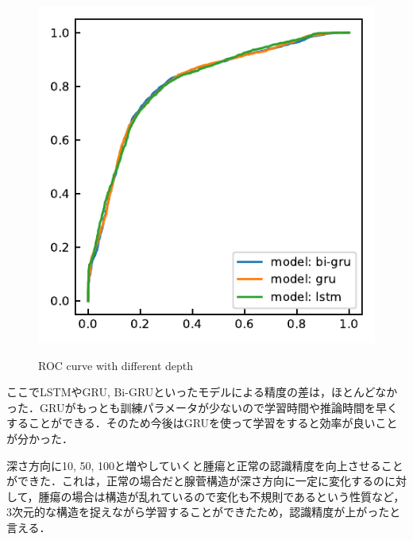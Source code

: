 \begin{figure}[H]
\begin{minipage}[b]{0.45\columnwidth}
		\label{fig:}
	\end{minipage}
	\begin{minipage}[b]{0.45\columnwidth}
		\centering
		\includegraphics[clip, width=\linewidth]{fig/chapter4/3d/roc/depth_100.pdf}
		\label{fig:}
	\end{minipage}
	
	\caption{ROC curve with different depth}
	\label{fig:2dcnn+LSTM_roc}
	
\end{figure}

ここでLSTMやGRU, Bi-GRUといったモデルによる精度の差は，ほとんどなかった．GRUがもっとも訓練パラメータが少ないので学習時間や推論時間を早くすることができる．そのため今後はGRUを使って学習をすると効率が良いことが分かった．

深さ方向に10, 50, 100と増やしていくと腫瘍と正常の認識精度を向上させることができた．これは，正常の場合だと腺菅構造が深さ方向に一定に変化するのに対して，腫瘍の場合は構造が乱れているので変化も不規則であるという性質など，3次元的な構造を捉えながら学習することができたため，認識精度が上がったと言える．

